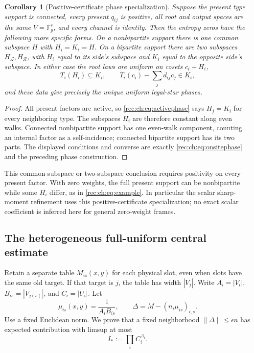 \documentclass[11pt]{article}
\newtheorem{corollary}[theorem]{Corollary}
\theoremstyle{definition}
\theoremstyle{remark}
\newcommand{\1}{\mathbf 1}
\providecommand{\Fp}{\mathbb F_p}
\begin{document}
\begin{corollary}[Positive-certificate phase specialization]\label{rec:ch:cor:positive-phases}
Suppose the present type support is connected, every present
$q_{ij}$ is positive, all root and output spaces are the same
$V=\Fp^r$, and every channel is identity. Then the entropy zeros
have the following more specific forms.
On a nonbipartite support there is one common subspace $H$ with
$H_i=K_i=H$. On a bipartite support there are two subspaces
$H_{\mathcal L},H_{\mathcal R}$, with $H_i$ equal to its side's
subspace and $K_i$ equal to the opposite side's subspace.
In either case the root laws are uniform on cosets $c_i+H_i$,
\[
 T_i(H_i)\subseteq K_i,\qquad
 T_i(c_i)-\sum_jd_{ij}c_j\in K_i,
\]
and these data give precisely the unique uniform legal-star phases.
\end{corollary}
\begin{proof}
All present factors are active, so \eqref{rec:ch:eq:activephase} says
$H_j=K_i$ for every neighboring type. The subspaces $H_i$ are
therefore constant along even walks. Connected nonbipartite support
has one even-walk component, counting an internal factor as a
self-incidence; connected bipartite support has its two parts.
The displayed conditions and converse are exactly
\eqref{rec:ch:eq:onsitephase} and the preceding phase construction.
\end{proof}

This common-subspace or two-subspace conclusion requires positivity
on every present factor. With zero weights, the full present support
can be nonbipartite while some $H_i$ differ, as in
\eqref{rec:ch:eq:example}. In particular the scalar sharp-moment
refinement uses this positive-certificate specialization; no exact
scalar coefficient is inferred here for general zero-weight frames.

\subsection{The heterogeneous full-uniform central estimate}
Retain a separate table $M_{is}(x,y)$ for each physical slot, even when slots have the same old target. If that target is $j$, the table has width $|V_j|$. Write $A_i=|V_i|$, $B_{is}=|V_{j(s)}|$, and $C_i=|U_i|$. Let
\[
 \mu_{is}(x,y)=\frac1{A_iB_{is}},\qquad
 \Delta=M-(n_i\mu_{is})_{i,s}.
\]
Use a fixed Euclidean norm. We prove that a fixed neighborhood $\|\Delta\|\le\epsilon n$ has expected contribution with limsup at most
\begin{equation}\label{rec:ch:eq:index}
 I_*:=\prod_i C_i^{A_i}.
\end{equation}
\end{document}
